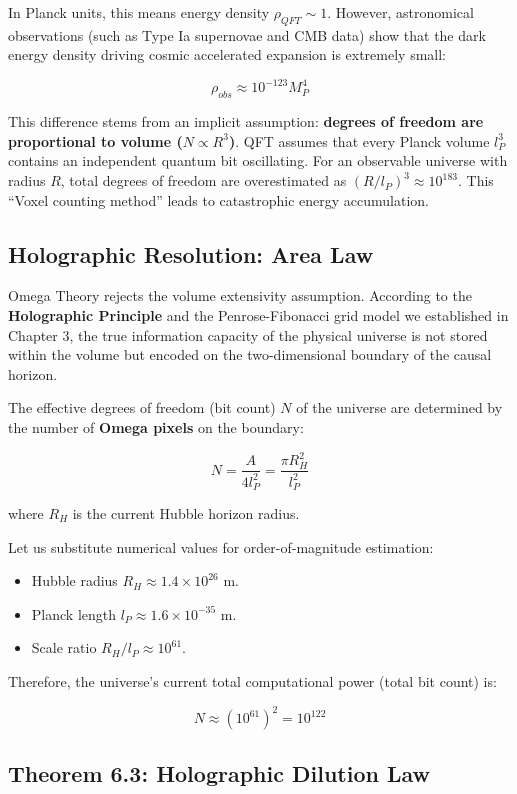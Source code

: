 In Planck units, this means energy density $\rho_{QFT} \sim 1$.
However, astronomical observations (such as Type Ia supernovae and CMB data) show that the dark energy density driving cosmic accelerated expansion is extremely small:

\[\rho_{obs} \approx 10^{-123} M_P^4\]

This difference stems from an implicit assumption: \textbf{degrees of freedom are proportional to volume ($N \propto R^3$)}.
QFT assumes that every Planck volume $l_P^3$ contains an independent quantum bit oscillating. For an observable universe with radius $R$, total degrees of freedom are overestimated as $(R/l_P)^3 \approx 10^{183}$. This ``Voxel counting method'' leads to catastrophic energy accumulation.

\subsection{Holographic Resolution: Area Law}

Omega Theory rejects the volume extensivity assumption. According to the \textbf{Holographic Principle} and the Penrose-Fibonacci grid model we established in Chapter 3, the true information capacity of the physical universe is not stored within the volume but encoded on the two-dimensional boundary of the causal horizon.

The effective degrees of freedom (bit count) $N$ of the universe are determined by the number of \textbf{Omega pixels} on the boundary:

\[N = \frac{A}{4 l_P^2} = \frac{\pi R_{H}^2}{l_P^2}\]

where $R_H$ is the current Hubble horizon radius.

Let us substitute numerical values for order-of-magnitude estimation:

\begin{itemize}
\item Hubble radius $R_H \approx 1.4 \times 10^{26} \text{ m}$.
\item Planck length $l_P \approx 1.6 \times 10^{-35} \text{ m}$.
\item Scale ratio $R_H / l_P \approx 10^{61}$.
\end{itemize}

Therefore, the universe's current total computational power (total bit count) is:

\[N \approx (10^{61})^2 = 10^{122}\]

\subsection{Theorem 6.3: Holographic Dilution Law}


